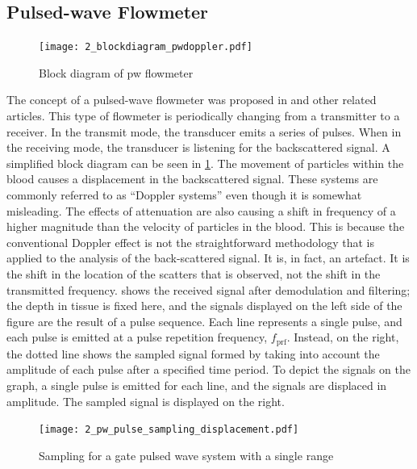 \subsection{Pulsed-wave Flowmeter}
\begin{figure}[htbp]
	\centering
	\texttt{[image: 2\_blockdiagram\_pwdoppler.pdf]}
	\caption[Block diagram of pulsed-wave flowmeter]{Block diagram of \gls{pw} flowmeter \cite{JensenUltrasoundBook}}
	\label{fig:2_devices_pw}
\end{figure}
The concept of a pulsed-wave flowmeter was proposed in \cite{Baker1970} and other related articles. This type of flowmeter is periodically changing from a transmitter to a receiver. In the transmit mode, the transducer emits a series of pulses. When in the receiving mode, the transducer is listening for the backscattered signal. A simplified block diagram can be seen in \cref{fig:2_devices_pw}. The movement of particles within the blood causes a displacement in the backscattered signal. These systems are commonly referred to as \enquote{Doppler systems} even though it is somewhat misleading. The effects of attenuation are also causing a shift in frequency of a higher magnitude than the velocity of particles in the blood. This is because the conventional Doppler effect is not the straightforward methodology that is applied to the analysis of the back-scattered signal. It is, in fact, an artefact. It is the shift in the location of the scatters that is observed, not the shift in the transmitted frequency.  shows the received signal after demodulation and filtering; the depth in tissue is fixed here, and the signals displayed on the left side of the figure are the result of a pulse sequence. Each line represents a single pulse, and each pulse is emitted at a pulse repetition frequency, $f_{\mathrm{prf}}$. Instead, on the right, the dotted line shows the sampled signal formed by taking into account the amplitude of each pulse after a specified time period. To depict the signals on the graph, a single pulse is emitted for each line, and the signals are displaced in amplitude. The sampled signal is displayed on the right.

\begin{figure}[ht]
	\centering
	\texttt{[image: 2\_pw\_pulse\_sampling\_displacement.pdf]}
	\caption[Sampling for a gate pulsed wave system with a single range]{Sampling for a gate pulsed wave system with a single range \cite{JensenUltrasoundBook}}
	\label{fig:2_pw_sampling_displacement}
\end{figure}


